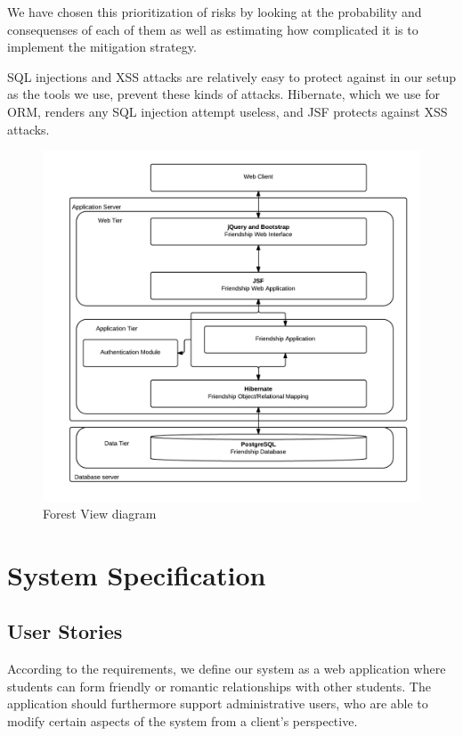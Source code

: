 \documentclass[a4paper]{article}
\begin{document}
We have chosen this prioritization of risks by looking at the probability and consequenses of each of them as well as estimating how complicated it is to implement the mitigation strategy.

SQL injections and XSS attacks are relatively easy to protect against in our setup as the tools we use, prevent these kinds of attacks. Hibernate, which we use for ORM, renders any SQL injection attempt useless, and JSF protects against XSS attacks.

\begin{figure}[h!]
\centering
\includegraphics[scale=0.3]{ForestView}
\caption{Forest View diagram}
\label{fig:forest_view}
\end{figure}

\section{System Specification}

\subsection{User Stories}
According to the requirements, we define our system as a web application where students can form friendly or romantic relationships with other students. The application should furthermore support administrative users, who are able to modify certain aspects of the system from a client's perspective.
\end{document}
